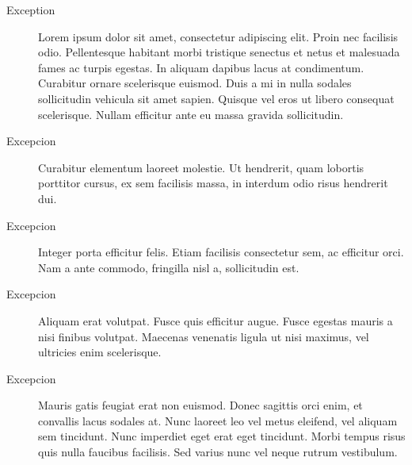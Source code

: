 \documentclass[titlepage,a4paper]{article}
\begin{document}
\begin{description}
\item[Exception] Lorem ipsum dolor sit amet, consectetur adipiscing elit. Proin nec facilisis odio. Pellentesque habitant morbi tristique senectus et netus et malesuada fames ac turpis egestas. In aliquam dapibus lacus at condimentum. Curabitur ornare scelerisque euismod. Duis a mi in nulla sodales sollicitudin vehicula sit amet sapien. Quisque vel eros ut libero consequat scelerisque. Nullam efficitur ante eu massa gravida sollicitudin.
\item[Excepcion] Curabitur elementum laoreet molestie. Ut hendrerit, quam lobortis porttitor cursus, ex sem facilisis massa, in interdum odio risus hendrerit dui.
\item[Excepcion] Integer porta efficitur felis. Etiam facilisis consectetur sem, ac efficitur orci. Nam a ante commodo, fringilla nisl a, sollicitudin est.
\item[Excepcion] Aliquam erat volutpat. Fusce quis efficitur augue. Fusce egestas mauris a nisi finibus volutpat. Maecenas venenatis ligula ut nisi maximus, vel ultricies enim scelerisque.
\item[Excepcion] Mauris gatis feugiat erat non euismod. Donec sagittis orci enim, et convallis lacus sodales at. Nunc laoreet leo vel metus eleifend, vel aliquam sem tincidunt. Nunc imperdiet eget erat eget tincidunt. Morbi tempus risus quis nulla faucibus facilisis. Sed varius nunc vel neque rutrum vestibulum.
\end{description}
\end{document}
